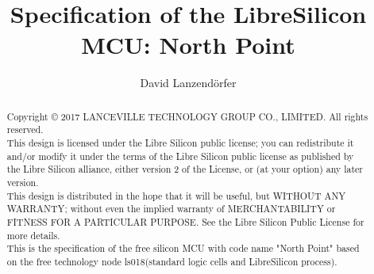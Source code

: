 \documentclass[12pt,a4paper,twoside]{article}
\author{David Lanzendörfer}
\title{Specification of the LibreSilicon MCU: North Point}
\begin{document}
\maketitle
\begin{abstract}
	Copyright © 2017 LANCEVILLE TECHNOLOGY GROUP CO., LIMITED. All rights reserved. \\

	This design is licensed under the Libre Silicon public license; you can redistribute it and/or modify it under the terms of the Libre Silicon public license as published by the Libre Silicon alliance, either version 2 of the License, or (at your option) any later version. \\

	This design is distributed in the hope that it will be useful, but WITHOUT ANY WARRANTY; without even the implied warranty of MERCHANTABILITY or FITNESS FOR A PARTICULAR PURPOSE.
	See the Libre Silicon Public License for more details. \\

	This is the specification of the free silicon MCU with code name "North Point" based on the free technology node ls018\footnotemark (standard logic cells and LibreSilicon process).

\end{abstract}
\vfill
\newpage
\end{document}
